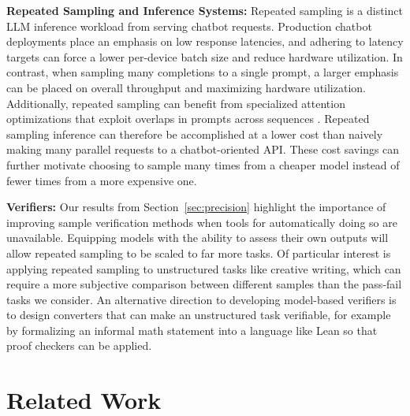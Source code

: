\documentclass[11pt]{article}
\begin{document}
\; 

\noindent \textbf{Repeated Sampling and Inference Systems:} Repeated sampling is a distinct LLM inference workload from serving chatbot requests. Production chatbot deployments place an emphasis on low response latencies, and adhering to latency targets can force a lower per-device batch size and reduce hardware utilization. In contrast, when sampling many completions to a single prompt, a larger emphasis can be placed on overall throughput and maximizing hardware utilization. Additionally, repeated sampling can benefit from specialized attention optimizations that exploit overlaps in prompts across sequences \cite{juravsky2024hydragen, athiwaratkun2024bifurcatedattentionacceleratingmassively, zheng2024sglangefficientexecutionstructured}. Repeated sampling inference can therefore be accomplished at a lower cost than naively making many parallel requests to a chatbot-oriented API. These cost savings can further motivate choosing to sample many times from a cheaper model instead of fewer times from a more expensive one. 

\;

\noindent \textbf{Verifiers:} Our results from Section~\ref{sec:precision} highlight the importance of improving sample verification methods when tools for automatically doing so are unavailable. Equipping models with the ability to assess their own outputs will allow repeated sampling to be scaled to far more tasks. Of particular interest is applying repeated sampling to unstructured tasks like creative writing, which can require a more subjective comparison between different samples than the pass-fail tasks we consider. An alternative direction to developing model-based verifiers is to design converters that can make an unstructured task verifiable, for example by formalizing an informal math statement into a language like Lean so that proof checkers can be applied.


\section{Related Work}
\end{document}
